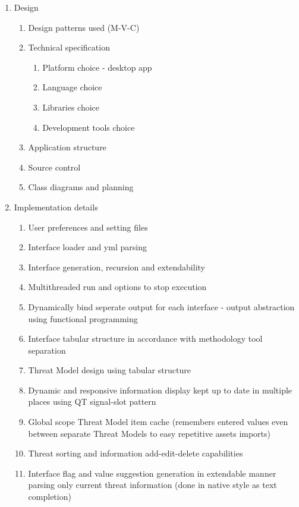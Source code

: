 \begin{enumerate}
	\item Design
	\begin{enumerate}
		\item Design patterns used (M-V-C)
		\item Technical specification
		\begin{enumerate}
			\item Platform choice - desktop app
			\item Language choice
			\item Libraries choice
			\item Development tools choice
		\end{enumerate}
	\item Application structure
	\item Source control
	\item Class diagrams and planning
	
	\end{enumerate}

	\item Implementation details
	\begin{enumerate}
		\item User preferences and setting files
		\item Interface loader and yml parsing
		\item Interface generation, recursion and extendability
		\item Multithreaded run and options to stop execution
		\item Dynamically bind seperate output for each interface - output abstraction using functional programming
		\item Interface tabular structure in accordance with methodology tool separation
		
		\item Threat Model design using tabular structure 
		\item Dynamic and responsive information display kept up to date in multiple places using QT signal-slot pattern
		\item Global scope Threat Model item cache (remembers entered values even between separate Threat Models to easy repetitive assets imports)
		\item Threat sorting and information add-edit-delete capabilities
		\item Interface flag and value suggestion generation in extendable manner parsing only current threat information (done in native style as text completion)
		

\end{enumerate}
\end{enumerate}
